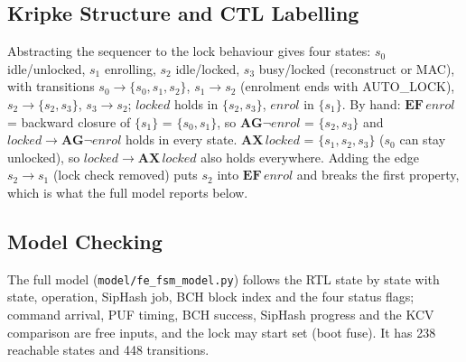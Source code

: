 \documentclass[11pt,a4paper]{article}
\begin{document}
\subsection{Kripke Structure and CTL Labelling}
Abstracting the sequencer to the lock behaviour gives four states: $s_0$ idle/unlocked, $s_1$
enrolling, $s_2$ idle/locked, $s_3$ busy/locked (reconstruct or MAC), with transitions
$s_0{\to}\{s_0,s_1,s_2\}$, $s_1{\to}s_2$ (enrolment ends with AUTO\_LOCK), $s_2{\to}\{s_2,s_3\}$,
$s_3{\to}s_2$; $locked$ holds in $\{s_2,s_3\}$, $enrol$ in $\{s_1\}$. By hand:
$\mathbf{EF}\,enrol$ = backward closure of $\{s_1\}$ = $\{s_0,s_1\}$, so $\mathbf{AG}\neg enrol$ =
$\{s_2,s_3\}$ and $locked\rightarrow\mathbf{AG}\neg enrol$ holds in every state. $\mathbf{AX}\,locked$
= $\{s_1,s_2,s_3\}$ ($s_0$ can stay unlocked), so $locked\rightarrow\mathbf{AX}\,locked$ also holds
everywhere. Adding the edge $s_2{\to}s_1$ (lock check removed) puts $s_2$ into $\mathbf{EF}\,enrol$ and
breaks the first property, which is what the full model reports below.

\subsection{Model Checking}
The full model (\texttt{model/fe\_fsm\_model.py}) follows the RTL state by state with state, operation,
SipHash job, BCH block index and the four status flags; command arrival, PUF timing, BCH success,
SipHash progress and the KCV comparison are free inputs, and the lock may start set (boot fuse). It has
238 reachable states and 448 transitions.
\end{document}
